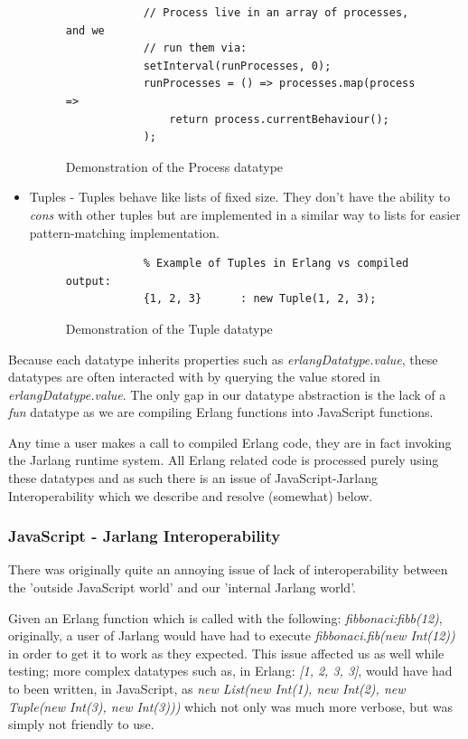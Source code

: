 \documentclass[twoside,12pt,titlepage,a4paper]{article}
\begin{document}
\begin{itemize}
\begin{figure}[H]
\begin{verbatim}
	        // Process live in an array of processes, and we
	        // run them via:
	        setInterval(runProcesses, 0);
	        runProcesses = () => processes.map(process =>
	            return process.currentBehaviour();
	        );

	\end{verbatim}
	\caption{Demonstration of the Process datatype}
	\end{figure}

	\item Tuples - Tuples behave like lists of fixed size. They don't have the ability to \textit{cons} with other tuples but are implemented in a similar way to lists for easier pattern-matching implementation.
	\begin{figure}[H]
	\begin{verbatim}
	        % Example of Tuples in Erlang vs compiled output:
	        {1, 2, 3}      : new Tuple(1, 2, 3);
	\end{verbatim}
	\caption{Demonstration of the Tuple datatype}
	\end{figure}

\end{itemize}

Because each datatype inherits properties such as \textit{erlangDatatype.value}, these datatypes are often interacted with by querying the value stored in \textit{erlangDatatype.value}. The only gap in our datatype abstraction is the lack of a \textit{fun} datatype as we are compiling Erlang functions into JavaScript functions. 

Any time a user makes a call to compiled Erlang code, they are in fact invoking the Jarlang runtime system. All Erlang related code is processed purely using these datatypes and as such there is an issue of JavaScript-Jarlang Interoperability which we describe and resolve (somewhat) below.

\subsubsection{JavaScript - Jarlang Interoperability}
There was originally quite an annoying issue of lack of interoperability between the 'outside JavaScript world' and our 'internal Jarlang world'. 

Given an Erlang function which is called with the following: \textit{fibbonaci:fibb(12)}, originally, a user of Jarlang would have had to execute \textit{fibbonaci.fib(new Int(12))} in order to get it to work as they expected. This issue affected us as well while testing; more complex datatypes such as, in Erlang: \textit{[1, 2, {3, 3}]}, would have had to been written, in JavaScript, as \textit{new List(new Int(1), new Int(2), new Tuple(new Int(3), new Int(3)))} which not only was much more verbose, but was simply not friendly to use.
\end{document}
